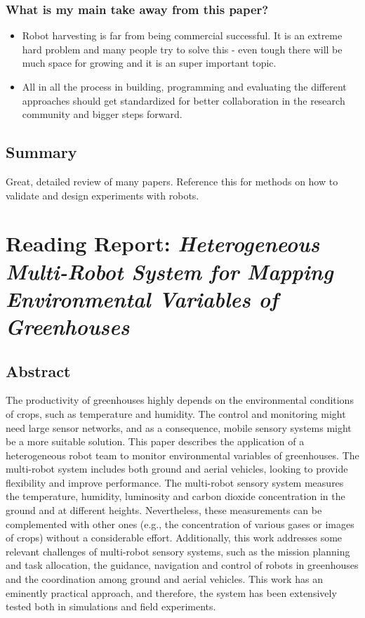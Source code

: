     \subsubsection*{What is my main take away from this paper?}
    \begin{itemize}
        \item Robot harvesting is far from being commercial successful. It is an extreme hard problem and many people try to solve this - even tough there will be much space for growing and it is an super important topic.
        \item All in all the process in building, programming and evaluating the different approaches should get standardized for better collaboration in the research community and bigger steps forward.
    \end{itemize}
    
    \subsection*{Summary}
    Great, detailed review of many papers. Reference this for methods on how to validate and design experiments with robots.

    \newpage
    
    \section{Reading Report: \emph{Heterogeneous Multi-Robot System for Mapping Environmental Variables of Greenhouses}}
    \label{sec:Roldan2016}
    \cite{Roldan2016}
    
    \subsection*{Abstract}
    The productivity of greenhouses highly depends on the environmental conditions of crops,
    such as temperature and humidity. The control and monitoring might need large sensor networks,
    and as a consequence, mobile sensory systems might be a more suitable solution. This paper describes
    the application of a heterogeneous robot team to monitor environmental variables of greenhouses.
    The multi-robot system includes both ground and aerial vehicles, looking to provide flexibility
    and improve performance. The multi-robot sensory system measures the temperature, humidity,
    luminosity and carbon dioxide concentration in the ground and at different heights. Nevertheless,
    these measurements can be complemented with other ones (e.g., the concentration of various
    gases or images of crops) without a considerable effort. Additionally, this work addresses some
    relevant challenges of multi-robot sensory systems, such as the mission planning and task allocation,
    the guidance, navigation and control of robots in greenhouses and the coordination among ground
    and aerial vehicles. This work has an eminently practical approach, and therefore, the system has
    been extensively tested both in simulations and field experiments.
    
